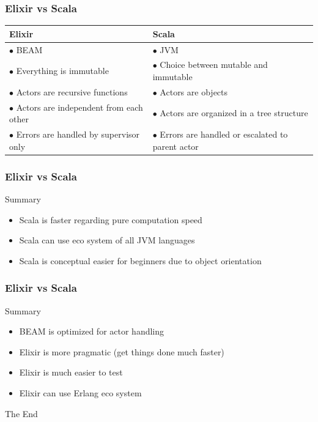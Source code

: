 \documentclass{beamer}
\begin{document}
\begin{frame}
\frametitle{Elixir vs Scala}
\begin{table}
\begin{tabular}{p{5cm} p{5cm}}
\toprule
\textbf{Elixir} & \textbf{Scala}\\
\midrule
$\bullet$ BEAM & $\bullet$ JVM \\
$\bullet$ Everything is immutable & $\bullet$ Choice between mutable and immutable\\
$\bullet$ Actors are recursive functions & $\bullet$ Actors are objects\\
$\bullet$ Actors are independent from each other & $\bullet$ Actors are organized in a tree structure \\
$\bullet$ Errors are handled by supervisor only & $\bullet$ Errors are handled or escalated to parent actor\\\bottomrule
\end{tabular}
\end{table}
\end{frame}



\begin{frame}
\frametitle{Elixir vs Scala}
\Huge{Summary}
\Large
\begin{itemize}[<+->]
\item Scala is faster regarding pure computation speed
\item Scala can use eco system of all JVM languages
\item Scala is conceptual easier for beginners due to object orientation
\end{itemize}
\end{frame}


\begin{frame}
\frametitle{Elixir vs Scala}
\Huge{Summary}
\Large
\begin{itemize}[<+->]
\item BEAM is optimized for actor handling
\item Elixir is more pragmatic (get things done much faster)
\item Elixir is much easier to test
\item Elixir can use Erlang eco system
\end{itemize}
\end{frame}



\begin{frame}
\Huge{\centerline{The End}}
\end{frame}

\end{document}
